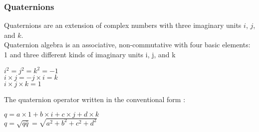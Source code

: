 \label{definition}
\begin{frame}\frametitle{Quaternions}
Quaternions are an extension of complex numbers with three imaginary units $i$, $j$, and $k$.
\\
Quaternion algebra is an associative, non-commutative with four basic elements: %
1 and three different kinds of imaginary units i, j, and k 
\begin{center}

$ i^2 =j^2 = k^2 = -1$\\ $i\times j = -j\times i = k$ \\ $i \times j \times k=1 $
\end{center}
The quaternion operator written in the conventional form :
\begin{center}
$q=a\times 1+b\times i+c\times j+d\times k$\\
$q=\sqrt{q\bar{q}}= \sqrt{a^2+b^2+c^2+d^2}$

\end{center}

 

\end{frame}
